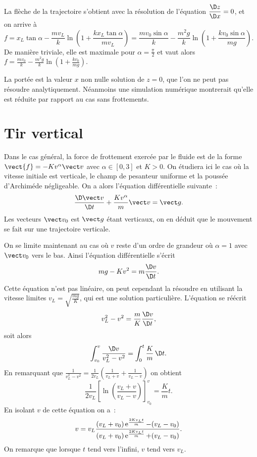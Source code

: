 La flèche de la trajectoire s'obtient avec la résolution de l'équation $\derived{z}{x}=0$, et on arrive à
\begin{equation}
  f = x_L \tan \alpha - \frac{mv_L}{k}\ln\left(1 + \frac{k x_L \tan \alpha}{m v_L}\right) = \frac{m v_0 \sin \alpha}{k} - \frac{m^2 g}{k}\ln\left(1 + \frac{k v_0 \sin \alpha}{m g}\right).
\end{equation}
De manière triviale, elle est maximale pour $\alpha = \frac{\pi}{2}$ et vaut alors $f =  \frac{m v_0}{k} - \frac{m^2 g}{k}\ln\left(1 + \frac{k v_0}{m g}\right)$.

La portée est la valeur $x$ non nulle solution de $z=0$, que l'on ne peut pas résoudre analytiquement. Néanmoins une simulation numérique montrerait qu'elle est réduite par rapport au cas sans frottements.

\section{Tir vertical}
\label{chap3-sec:tirvertical}

Dans le cas général, la force de frottement exercée par le fluide est de la forme $\vect{f}=-Kv^\alpha\vv$ avec $\alpha \in [0, 3]$ et $K>0$. On étudiera ici le cas où la vitesse initiale est verticale, le champ de pesanteur uniforme et la poussée d'Archiméde négligeable. On a alors l'équation différentielle suivante~:
\begin{equation}
  \derived{\vv}{t} + \frac{Kv^\alpha}{m}\vv = \vg.
\end{equation}
Les vecteurs $\vv_0$ est $\vg$ étant verticaux, on en déduit que le mouvement se fait sur une trajectoire verticale.

On se limite maintenant au cas où $v$ reste d'un ordre de grandeur où $\alpha=1$ avec $\vv_0$ vers le bas. Ainsi l'équation différentielle s'écrit
\begin{equation}
  mg -Kv^2 = m\derived{v}{t}.
\end{equation}
Cette équation n'est pas linéaire, on peut cependant la résoudre en utilisant la vitesse limites $v_L = \sqrt{\frac{mg}{K}}$, qui est une solution particulière. L'équation se réécrit
\begin{equation}
  v_L^2-v^2 = \frac{m}{K}\derived{v}{t},
\end{equation}
soit alors
\begin{equation}
  \int_{v_0}^v \frac{\diff v}{v_L^2-v^2} = \int_0^t\frac{K}{m}\diff t.
\end{equation}
En remarquant que $\frac{1}{v_L^2-v^2} = \frac{1}{2 v_L}\left(\frac{1}{v_L+v}+\frac{1}{v_L-v}\right)$ on obtient
\begin{equation}
  \frac{1}{2v_L}\left[\ln\left(\frac{v_L+v}{v_L-v}\right)\right]^{v}_{v_0} = \frac{K}{m}t.
\end{equation}
En isolant $v$ de cette équation on a~:
\begin{equation}
  v = v_L \frac{(v_L+v_0)\operatorname{e}^{\frac{2K v_L t}{m}}-(v_L-v_0)}{(v_L+v_0)\operatorname{e}^{\frac{2K v_L t}{m}}+(v_L-v_0)}.
\end{equation}
On remarque que lorsque $t$ tend vers l'infini, $v$ tend vers $v_L$.

